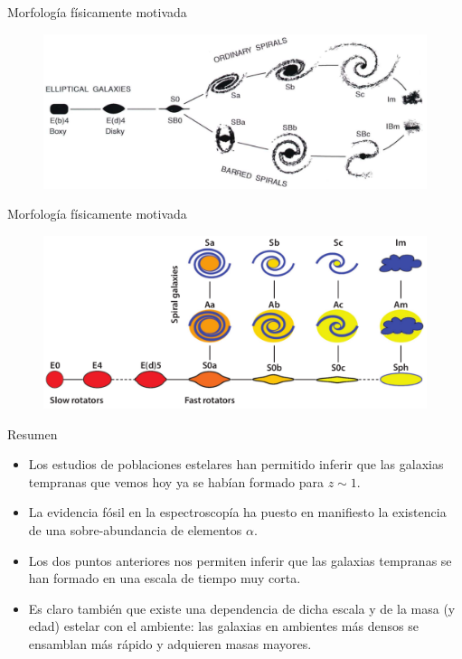 \documentclass[xcolor=dvipsnames,4pt]{beamer}
\newenvironment{changemargin}[2]{%
  \begin{list}{}{%
    \setlength{\topsep}{0pt}%
    \setlength{\leftmargin}{#1}%
    \setlength{\rightmargin}{#2}%
    \setlength{\listparindent}{\parindent}%
    \setlength{\itemindent}{\parindent}%
    \setlength{\parsep}{\parskip}%
  }%
\item[]}{\end{list}}
\begin{document}
\begin{frame}{Morfología físicamente motivada}
\begin{changemargin}{-1cm}{-1cm}
\begin{figure}
\centering
\includegraphics[scale=0.8]{img/hubble_diap.png}
\end{figure}
\end{changemargin}
\end{frame}

\begin{frame}{Morfología físicamente motivada}
\begin{changemargin}{-1cm}{-1cm}
\begin{figure}
\centering
\includegraphics[scale=0.8]{img/comb.png}
\end{figure}
\end{changemargin}
\end{frame}

\begin{frame}{Resumen}
\begin{itemize}
\item Los estudios de poblaciones estelares han permitido inferir que las galaxias tempranas que vemos hoy ya se habían formado para $z\sim1$.
\item La evidencia fósil en la espectroscopía ha puesto en manifiesto la existencia de una sobre-abundancia de elementos $\alpha$.
\item Los dos puntos anteriores nos permiten inferir que las galaxias tempranas se han formado en una escala de tiempo muy corta.
\item Es claro también que existe una dependencia de dicha escala y de la masa (y edad) estelar con el ambiente: \alert{las galaxias en ambientes más densos se ensamblan más rápido y adquieren masas mayores}.
\end{itemize}
\end{frame}
\end{document}
